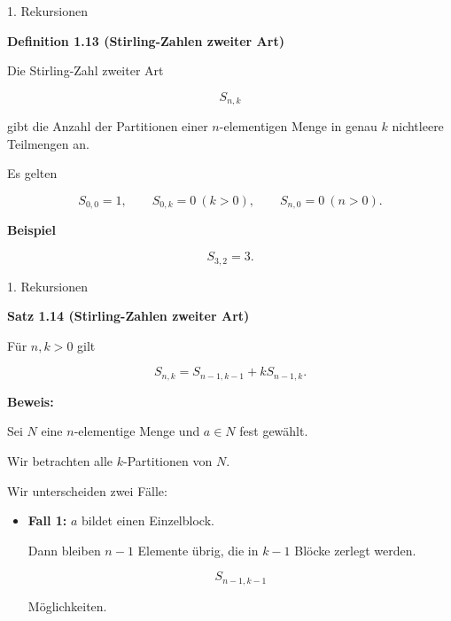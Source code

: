 \documentclass{beamer}
\begin{document}
\begin{frame}{1. Rekursionen}

\textbf{Definition 1.13 (Stirling-Zahlen zweiter Art)}

\vspace{0.3cm}

Die Stirling-Zahl zweiter Art

\[
S_{n,k}
\]

gibt die Anzahl der Partitionen einer
\(n\)-elementigen Menge in genau
\(k\) nichtleere Teilmengen an.

\vspace{0.4cm}

Es gelten

\[
S_{0,0}=1,
\qquad
S_{0,k}=0 \ (k>0),
\qquad
S_{n,0}=0 \ (n>0).
\]

\textbf{Beispiel}

\[
S_{3,2}=3.
\]

\end{frame}

\begin{frame}{1. Rekursionen}

\textbf{Satz 1.14 (Stirling-Zahlen zweiter Art)}

\medskip

Für \(n,k>0\) gilt

\[
S_{n,k}=S_{n-1,k-1}+kS_{n-1,k}.
\]

\bigskip

\textbf{Beweis:}

Sei \(N\) eine \(n\)-elementige Menge und \(a\in N\) fest gewählt.

Wir betrachten alle \(k\)-Partitionen von \(N\).

Wir unterscheiden zwei Fälle:

\begin{itemize}
\item[\(\blacktriangleright\)] \textbf{Fall 1:} \(a\) bildet einen Einzelblock.

Dann bleiben \(n-1\) Elemente übrig, die in \(k-1\) Blöcke zerlegt werden.

\[
S_{n-1,k-1}
\]

Möglichkeiten.
\end{itemize}

\end{frame}
\end{document}
